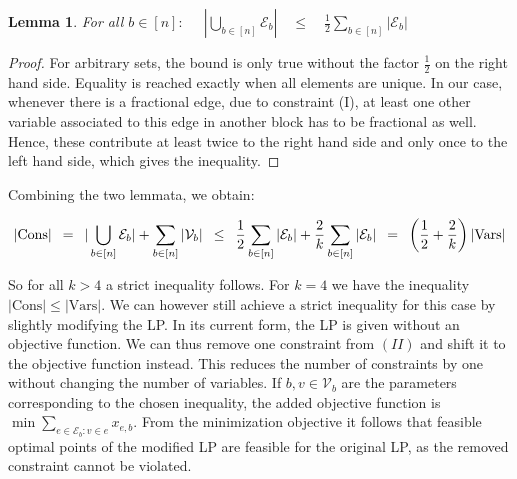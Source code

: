 \documentclass[11pt]{article}
\newcommand{\Hquad}{\hspace{0.5em}}
\newtheorem{lemma}[theorem]{Lemma}
\begin{document}
\begin{lemma}
For all $b \in [n]:$ $\quad|\bigcup_{b \in [n]}\mathcal{E}_b|\quad \le \quad \frac{1}{2}\sum_{b \in [n]}|\mathcal{E}_b|$
\end{lemma}
\begin{proof}
For arbitrary sets, the bound is only true without the factor $\tfrac{1}{2}$ on the right hand side. Equality is reached exactly when all elements are unique. In our case, whenever there is a fractional edge, due to constraint (I), at least one other variable associated to this edge in another block has to be fractional as well. Hence, these contribute at least twice to the right hand side and only once to the left hand side, which gives the inequality. 
\end{proof}

\noindent Combining the two lemmata, we obtain:

\begin{equation*}
    |\mathrm{Cons}| \Hquad=\Hquad |\bigcup_{b \in [n]} \mathcal{E}_b| + \sum_{b \in [n]}|\mathcal{V}_b|\Hquad \le\Hquad \frac{1}{2}\sum_{b \in [n]}|\mathcal{E}_b| + \frac{2}{k}\sum_{b \in [n]}|\mathcal{E}_b| \Hquad=\Hquad \left(\frac{1}{2} + \frac{2}{k}\right)|\mathrm{Vars}|
\end{equation*}

So for all $k > 4$ a strict inequality follows. For $k=4$ we have the inequality $|\mathrm{Cons}| \le |\mathrm{Vars}|$. We can however still achieve a strict inequality for this case by slightly modifying the LP. In its current form, the LP is given without an objective function. We can thus remove one constraint from $(II)$ and shift it to the objective function instead. This reduces the number of constraints by one without changing the number of variables. If $b, v \in \mathcal{V}_b$ are the parameters corresponding to the chosen inequality, the added objective function is $\min \sum_{e\in\mathcal{E}_b: v \in e}x_{e,b}$. From the minimization objective it follows that feasible optimal points of the modified LP are feasible for the original LP, as the removed constraint cannot be violated.
\end{document}
